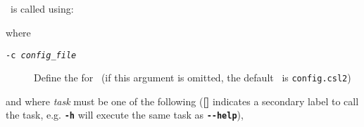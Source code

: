 \subsection{\label{sec:CommandLineArguments}}

\CNAME\ is called using:

\texttt{}

where

\begin{description}
  \item [\texttt{-c \emph{config\_file}}] Define the \config for \CNAME\ (if this argument is omitted, the default \config\ is \texttt{config.csl2})
\end{description}

and where \emph{task} must be one of the following (\textbf{[]} indicates a secondary label to call the task, e.g. \textbf{\texttt{-h}} will execute the same task as \textbf{\texttt{-{}-help}}),

